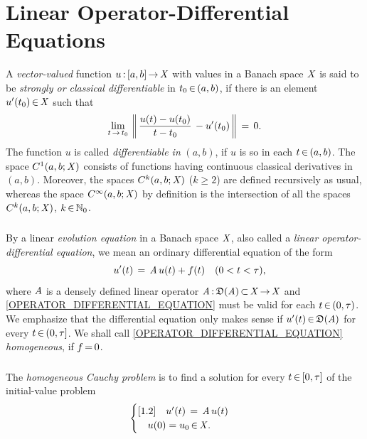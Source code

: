 \documentclass[11pt,twoside]{article}
\begin{document}
\section{Linear Operator-Differential Equations}
A \textit{vector-valued} function $u{\,:\,}[a,b] {\,\to\,} \mathit{X}$
with values in a Banach space $\mathit{X}$
is said to be \textit{strongly or classical differentiable} in $t_0 {\,\in\,} (a,b)$,
if there is an element $u'(t_0) {\,\in\,} \mathit{X}$ such that
\[
\lim_{t {\,\to\,} t_0} \,
\left\lVert  \, \frac{u(t)-u(t_0)}{t-t_0} \, - u'(t_0) \,  \right\rVert \,=\, 0.
\]
The function $u$ is called \textit{differentiable in} $(a,b)$, 
if $u$ is so in each $t {\,\in\,} (a,b)$.
The space $C^1(a,b;\mathit{X})$ consists of functions
having continuous classical derivatives in $(a,b)$.
Moreover,
the spaces $C^k(a,b;\mathit{X})$ ($k \geq 2$) are defined recursively as usual,
whereas the space $C^{\infty}(a,b;\mathit{X})$ by definition is 
the intersection of all the spaces $C^k(a,b;\mathit{X})$, $k {\,\in\,} {\mathbb{N}}_0$.

\subsubsection*{} %
By a linear \textit{evolution equation} in a Banach space $\mathit{X}$,
also  called a \textit{linear operator-differential equation},
we mean an ordinary differential equation of the form
\begin{equation}\label{OPERATOR_DIFFERENTIAL_EQUATION}
\quad u'(t) \,=\, \mathit{A} \, u(t) + f(t) \quad (0 < t < \tau),
\end{equation}
where $\mathit{A}$ is a densely defined linear operator
$\mathit{A} {\,:\,} \mathfrak{D}(\mathit{A}) {\,\subset\,} \mathit{X} {\,\to\,} \mathit{X}$
and \eqref{OPERATOR_DIFFERENTIAL_EQUATION} must be valid
for each $t {\,\in\,} (0,\tau)$.
We emphasize
that the differential equation only makes sense
if $u'(t) {\,\in\,} \mathfrak{D}(\mathit{A})$ for every $t {\,\in\,} (0,\tau]$.
We shall call \ref{OPERATOR_DIFFERENTIAL_EQUATION} \textit{homogeneous},
if $f {\,=\,} 0$.

\subsubsection*{} %
The \textit{homogeneous Cauchy problem}
is to find a solution for every $t {\,\in\,} [0,\tau]$
of the initial-value problem
\begin{equation}\label{HOMOGENEOUS_CAUCHY_PROBLEM}
\begin{cases}[1.2]
\quad u'(t) \,=\, \mathit{A} \, u(t) \\
\quad u(0)=u_0 {\,\in\,} \mathit{X}. \\
\end{cases}
\end{equation}
\end{document}
